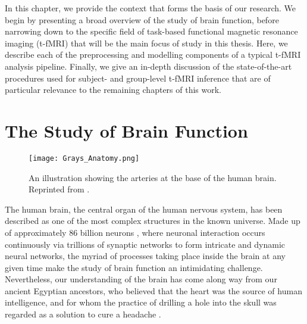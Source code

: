 In this chapter, we provide the context that forms the basis of our research. We begin by presenting a broad overview of the study of brain function, before narrowing down to the specific field of task-based functional magnetic resonance imaging (t-fMRI) that will be the main focus of study in this thesis. Here, we describe each of the preprocessing and modelling components of a typical t-fMRI analysis pipeline. Finally, we give an in-depth discussion of the state-of-the-art procedures used for subject- and group-level t-fMRI inference that are of particular relevance to the remaining chapters of this work. 

\pagebreak

\section{The Study of Brain Function}

\begin{figure}[htbp]
\centering
	\texttt{[image: Grays\_Anatomy.png]}	
\caption{An illustration showing the arteries at the base of the human brain. Reprinted from \citet*{Anatomy1918-do}.}
\end{figure}

The human brain, the central organ of the human nervous system, has been described as one of the most complex structures in the known universe. Made up of approximately 86 billion neurons \citep{Azevedo2009-qj}, where neuronal interaction occurs continuously via trillions of synaptic networks to form intricate and dynamic neural networks, the myriad of processes taking place inside the brain at any given time make the study of brain function an intimidating challenge. Nevertheless, our understanding of the brain has come along way from our ancient Egyptian ancestors, who believed that the heart was the source of human intelligence, and for whom the practice of drilling a hole into the skull was regarded as a solution to cure a headache \citep{Adelman1987-hs, Mohamed2014-gl}. 

